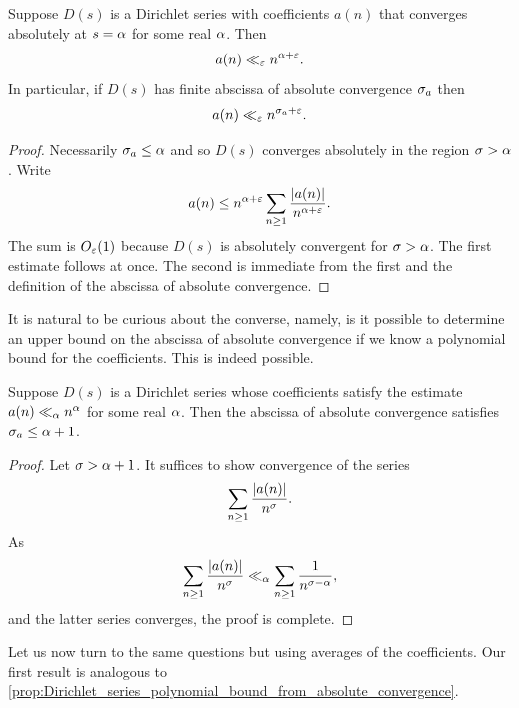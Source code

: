 \documentclass[12pt]{article}
\begin{document}
    \begin{proposition}\label{prop:Dirichlet_series_polynomial_bound_from_absolute_convergence}
      Suppose \(D(s)\) is a Dirichlet series with coefficients \(a(n)\) that converges absolutely at \(s = \alpha\) for some real \(\alpha\). Then
      \[
        a(n) \ll_{\varepsilon} n^{\alpha+\varepsilon}.
      \]
      In particular, if \(D(s)\) has finite abscissa of absolute convergence \(\sigma_{a}\) then
      \[
        a(n) \ll_{\varepsilon} n^{\sigma_{a}+\varepsilon}.
      \]
    \end{proposition}
    \begin{proof}
      Necessarily \(\sigma_{a} \le \alpha\) and so \(D(s)\) converges absolutely in the region \(\sigma > \alpha\). Write
      \[
        a(n) \le n^{\alpha+\varepsilon}\sum_{n \ge 1}\frac{|a(n)|}{n^{\alpha+\varepsilon}}.
      \]
      The sum is \(O_{\varepsilon}(1)\) because \(D(s)\) is absolutely convergent for \(\sigma > \alpha\). The first estimate follows at once. The second is immediate from the first and the definition of the abscissa of absolute convergence.
    \end{proof}
    
    It is natural to be curious about the converse, namely, is it possible to determine an upper bound on the abscissa of absolute convergence if we know a polynomial bound for the coefficients. This is indeed possible.
    
    \begin{proposition}\label{prop:Dirichlet_series_convergence_polynomial_bound}
      Suppose \(D(s)\) is a Dirichlet series whose coefficients satisfy the estimate \(a(n) \ll_{\alpha} n^{\alpha}\) for some real \(\alpha\). Then the abscissa of absolute convergence satisfies \(\sigma_{a} \le \alpha+1\).
    \end{proposition}
    \begin{proof}
      Let \(\sigma > \alpha+1\). It suffices to show convergence of the series
      \[
        \sum_{n \ge 1}\frac{|a(n)|}{n^{\sigma}}.
      \]
      As
      \[
        \sum_{n \ge 1}\frac{|a(n)|}{n^{\sigma}} \ll_{\alpha} \sum_{n \ge 1}\frac{1}{n^{\sigma-\alpha}},
      \]
      and the latter series converges, the proof is complete.
    \end{proof}

    Let us now turn to the same questions but using averages of the coefficients. Our first result is analogous to \cref{prop:Dirichlet_series_polynomial_bound_from_absolute_convergence}.
\end{document}
